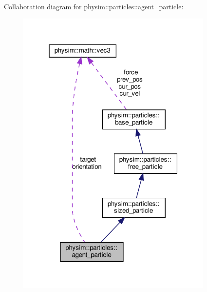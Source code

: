 Collaboration diagram for physim\+:\+:particles\+:\+:agent\+\_\+particle\+:\nopagebreak
\begin{figure}[H]
\begin{center}
\leavevmode
\includegraphics[width=277pt]{classphysim_1_1particles_1_1agent__particle__coll__graph}
\end{center}
\end{figure}
